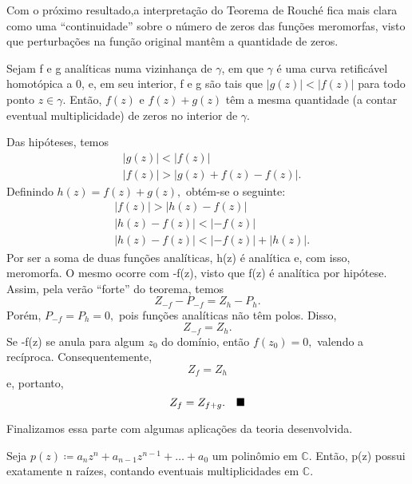 \documentclass[ComplexAnalysis/complex.tex]{subfiles}
\begin{document}
Com o próximo resultado,a interpretação do Teorema de Rouché fica mais clara como uma ``continuidade'' sobre o número de zeros das funções meromorfas,
visto que perturbações na função original mantêm a quantidade de zeros.
\begin{theorem*}
	Sejam f e g analíticas numa vizinhança de \(\gamma \), em que \(\gamma \) é uma curva retificável homotópica a 0, e, em seu interior,
	f e g são tais que \(|g(z)| < |f(z)|\) para todo ponto \(z\in \gamma .\) Então, \(f(z)\) e \(f(z) + g(z)\) têm a mesma quantidade (a contar eventual multiplicidade) de zeros no interior de \(\gamma \).
\end{theorem*}
\begin{proof*}
	Das hipóteses, temos
	\begin{align*}
		 & |g(z)| < |f(z)|                \\
		 & |f(z)| > |g(z) + f(z) - f(z)|.
	\end{align*}
	Definindo \(h(z) = f(z) + g(z),\) obtém-se o seguinte:
	\begin{align*}
		 & |f(z)| > |h(z) - f(z)|            \\
		 & |h(z) - f(z)| < |-f(z)|           \\
		 & |h(z) - f(z)| < |-f(z)| + |h(z)|.
	\end{align*}
	Por ser a soma de duas funções analíticas, h(z) é analítica e, com isso, meromorfa. O mesmo ocorre com -f(z), visto que f(z) é analítica por hipótese.
	Assim, pela verão ``forte'' do teorema, temos
	\[
		Z_{-f} - P_{-f} = Z_{h} - P_{h}.
	\]
	Porém, \(P_{-f} = P_{h} = 0,\) pois funções analíticas não têm polos. Disso,
	\[
		Z_{-f} = Z_{h}.
	\]
	Se -f(z) se anula para algum \(z_{0}\) do domínio, então \(f(z_{0}) = 0, \) valendo a recíproca. Consequentemente,
	\[
		Z_{f} = Z_{h}
	\]
	e, portanto,
	\[
		Z_{f} = Z_{f+g}.\quad \text{$\blacksquare$}
	\]
\end{proof*}
Finalizamos essa parte com algumas aplicações da teoria desenvolvida.
\hypertarget{fundamental-theorem-algebra}{\begin{theorem*}
		Seja \(p(z)\coloneqq a_{n}z^{n} + a_{n-1}z^{n-1} + \dotsc + a_{0}\) um polinômio em \(\mathbb{C}.\) Então, p(z) possui exatamente n raízes, contando
		eventuais multiplicidades em \(\mathbb{C}.\)
	\end{theorem*}}
\end{document}
